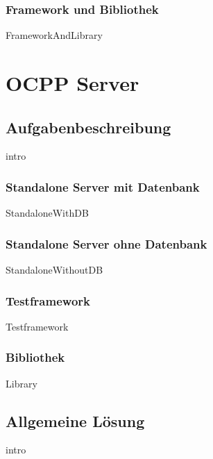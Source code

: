 \documentclass{article}
\begin{document}
        \newpage
        \subsubsection{Framework und Bibliothek}

            {FrameworkAndLibrary}
\newpage



\section{OCPP Server}
    \subsection{Aufgabenbeschreibung}
    \label{kap:taskDescription}
        {intro}

        \newpage
        \subsubsection{Standalone Server mit Datenbank}
        \label{kap:taskDescription:standaloneWithDB}
            {StandaloneWithDB}

        \newpage
        \subsubsection{Standalone Server ohne Datenbank}
        {StandaloneWithoutDB}

        \newpage
        \subsubsection{Testframework}
            {Testframework}

        \newpage
        \subsubsection{Bibliothek}
            {Library}
    \newpage
    \subsection{Allgemeine Lösung}
    \label{kap:commonSolution}
        {intro}
\end{document}
